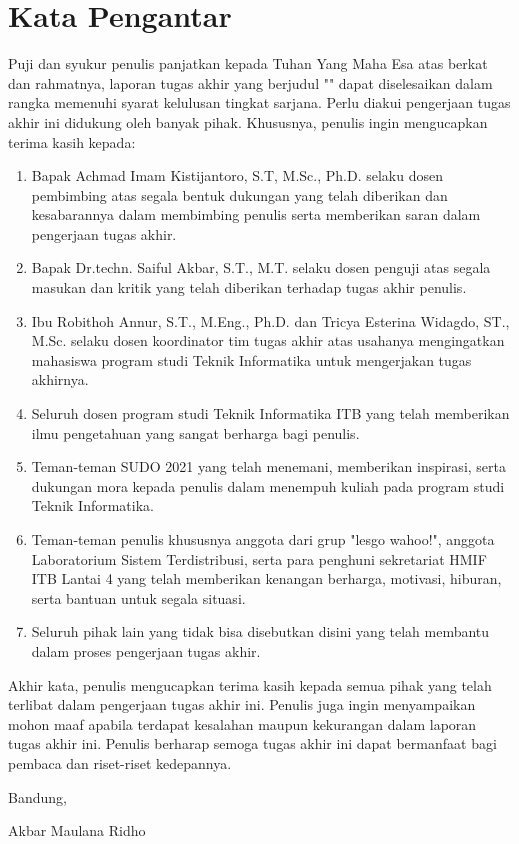 \chapter*{Kata Pengantar}

Puji dan syukur penulis panjatkan kepada Tuhan Yang Maha Esa atas berkat dan rahmatnya, laporan tugas akhir yang berjudul "\thetitle" dapat diselesaikan dalam rangka memenuhi syarat kelulusan tingkat sarjana. Perlu diakui pengerjaan tugas akhir ini didukung oleh banyak pihak. Khususnya, penulis ingin mengucapkan terima kasih kepada:

\begin{enumerate}
  \item Bapak Achmad Imam Kistijantoro, S.T, M.Sc., Ph.D. selaku dosen pembimbing atas segala bentuk dukungan yang telah diberikan dan kesabarannya dalam membimbing penulis serta memberikan saran dalam pengerjaan tugas akhir.
  \item Bapak Dr.techn. Saiful Akbar, S.T., M.T. selaku dosen penguji atas segala masukan dan kritik yang telah diberikan terhadap tugas akhir penulis.
  \item Ibu Robithoh Annur, S.T., M.Eng., Ph.D. dan Tricya Esterina Widagdo, ST., M.Sc. selaku dosen koordinator tim tugas akhir atas usahanya mengingatkan mahasiswa program studi Teknik Informatika untuk mengerjakan tugas akhirnya.
  \item Seluruh dosen program studi Teknik Informatika ITB yang telah memberikan ilmu pengetahuan yang sangat berharga bagi penulis.
  \item Teman-teman SUDO 2021 yang telah menemani, memberikan inspirasi, serta dukungan mora kepada penulis dalam menempuh kuliah pada program studi Teknik Informatika.
  \item Teman-teman penulis khususnya anggota dari grup "lesgo wahoo!", anggota Laboratorium Sistem Terdistribusi, serta para penghuni sekretariat HMIF ITB Lantai 4 yang telah memberikan kenangan berharga, motivasi, hiburan, serta bantuan untuk segala situasi.
  \item Seluruh pihak lain yang tidak bisa disebutkan disini yang telah membantu dalam proses pengerjaan tugas akhir.
\end{enumerate}

Akhir kata, penulis mengucapkan terima kasih kepada semua pihak yang telah terlibat dalam pengerjaan tugas akhir ini. Penulis juga ingin menyampaikan mohon maaf apabila terdapat kesalahan maupun kekurangan dalam laporan tugas akhir ini. Penulis berharap semoga tugas akhir ini dapat bermanfaat bagi pembaca dan riset-riset kedepannya.

\begin{flushright}
  \vspace{0.5cm}
  Bandung, \tanggalpengesahan


  \vspace{1.5cm}

  Akbar Maulana Ridho
\end{flushright}